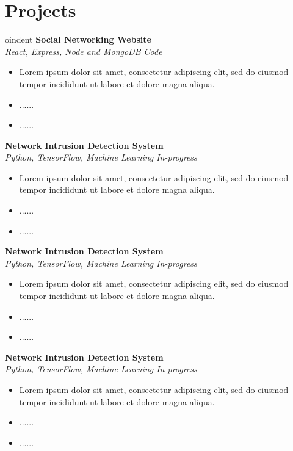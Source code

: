 \documentclass{article}
\begin{document}
\begin{minipage}[t]{0.49\textwidth}
\section*{Projects}

oindent
\textbf{Social Networking Website}\\
\textit{React, Express, Node and MongoDB \hfill \href{link}{Code}}
\begin{itemize}
    \item Lorem ipsum dolor sit amet, consectetur adipiscing elit, sed do eiusmod tempor incididunt ut labore et dolore magna aliqua. 
    \item ......
    \item ......
\end{itemize}

\textbf{Network Intrusion Detection System}\\
\textit{Python, TensorFlow, Machine Learning \hfill In-progress}
\begin{itemize}
   \item Lorem ipsum dolor sit amet, consectetur adipiscing elit, sed do eiusmod tempor incididunt ut labore et dolore magna aliqua. 
    \item ......
    \item ......
\end{itemize}

\textbf{Network Intrusion Detection System}\\
\textit{Python, TensorFlow, Machine Learning \hfill In-progress}
\begin{itemize}
   \item Lorem ipsum dolor sit amet, consectetur adipiscing elit, sed do eiusmod tempor incididunt ut labore et dolore magna aliqua. 
    \item ......
    \item ......
\end{itemize}

\textbf{Network Intrusion Detection System}\\
\textit{Python, TensorFlow, Machine Learning \hfill In-progress}
\begin{itemize}
   \item Lorem ipsum dolor sit amet, consectetur adipiscing elit, sed do eiusmod tempor incididunt ut labore et dolore magna aliqua. 
    \item ......
    \item ......
\end{itemize}






\end{minipage}
\end{document}
